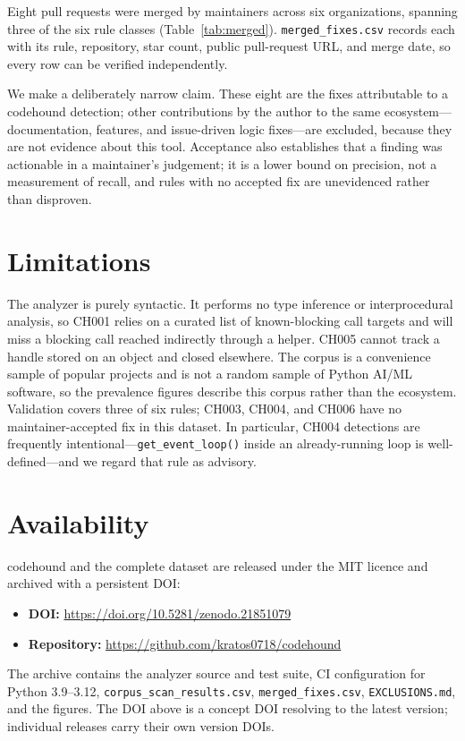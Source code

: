 \documentclass[conference]{IEEEtran}
\begin{document}
Eight pull requests were merged by maintainers across six organizations, spanning three of the six rule classes (Table~\ref{tab:merged}). \texttt{merged\_fixes.csv} records each with its rule, repository, star count, public pull-request URL, and merge date, so every row can be verified independently.

We make a deliberately narrow claim. These eight are the fixes attributable to a codehound detection; other contributions by the author to the same ecosystem---documentation, features, and issue-driven logic fixes---are excluded, because they are not evidence about this tool. Acceptance also establishes that a finding was actionable in a maintainer's judgement; it is a lower bound on precision, not a measurement of recall, and rules with no accepted fix are unevidenced rather than disproven.

\section{Limitations}
The analyzer is purely syntactic. It performs no type inference or interprocedural analysis, so CH001 relies on a curated list of known-blocking call targets and will miss a blocking call reached indirectly through a helper. CH005 cannot track a handle stored on an object and closed elsewhere. The corpus is a convenience sample of popular projects and is not a random sample of Python AI/ML software, so the prevalence figures describe this corpus rather than the ecosystem. Validation covers three of six rules; CH003, CH004, and CH006 have no maintainer-accepted fix in this dataset. In particular, CH004 detections are frequently intentional---\texttt{get\_event\_loop()} inside an already-running loop is well-defined---and we regard that rule as advisory.

\section{Availability}
codehound and the complete dataset are released under the MIT licence and archived with a persistent DOI:

\begin{itemize}
  \item \textbf{DOI:} \url{https://doi.org/10.5281/zenodo.21851079}
  \item \textbf{Repository:} \url{https://github.com/kratos0718/codehound}
\end{itemize}

The archive contains the analyzer source and test suite, CI configuration for Python 3.9--3.12, \texttt{corpus\_scan\_results.csv}, \texttt{merged\_fixes.csv}, \texttt{EXCLUSIONS.md}, and the figures. The DOI above is a concept DOI resolving to the latest version; individual releases carry their own version DOIs.
\end{document}
